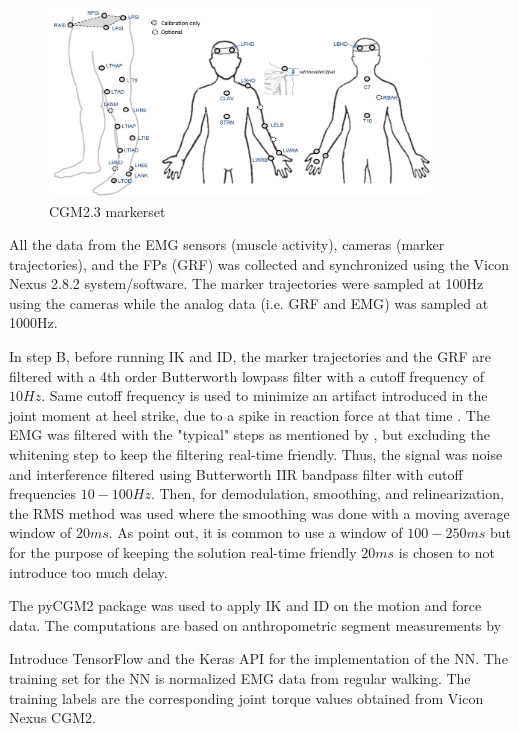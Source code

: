 \documentclass[../main.tex]{subfiles}
\begin{document}
\begin{figure}
    \centering
    \includegraphics[width=0.9\textwidth]{img/CGM23_markerset2.png}
    \caption{CGM2.3 markerset}
    \label{fig:cgm23-markerset}
\end{figure}

All the data from the \ac{EMG} sensors (muscle activity), cameras (marker trajectories), and the \acp{FP} (\ac{GRF}) was collected and synchronized using the Vicon Nexus 2.8.2 system/software.
The marker trajectories were sampled at 100Hz using the cameras while the analog data (i.e. \ac{GRF} and \ac{EMG}) was sampled at 1000Hz.

In step B, before running \ac{IK} and \ac{ID}, the marker trajectories and the \ac{GRF} are filtered with a 4th order Butterworth lowpass filter with a cutoff frequency of $10Hz$. 
Same cutoff frequency is used to minimize an artifact introduced in the joint moment at heel strike, due to a spike in reaction force at that time \cite{Kristianslund2012}.
The \ac{EMG} was filtered with the "typical" steps as mentioned by \citeauthor{Clancy2016} \parencite[99]{Clancy2016}, but excluding the whitening step to keep the filtering real-time friendly.
Thus, the signal was noise and interference filtered using Butterworth IIR bandpass filter with cutoff frequencies $10-100Hz$. 
Then, for demodulation, smoothing, and relinearization, the RMS method was used where the smoothing was done with a moving average window of $20ms$. 
As \citeauthor{Clancy2016} point out, it is common to use a window of $100-250 ms$ but for the purpose of keeping the solution real-time friendly $20ms$ is chosen to not introduce too much delay.

The pyCGM2 package \textcite{Leboeuf2019} was used to apply \ac{IK} and \ac{ID} on the motion and force data.
The computations are based on anthropometric segment measurements by 

Introduce TensorFlow and the Keras API for the implementation of the \ac{NN}.
The training set for the \ac{NN} is normalized EMG data from regular walking.
The training labels are the corresponding joint torque values obtained from Vicon Nexus CGM2.
\end{document}
